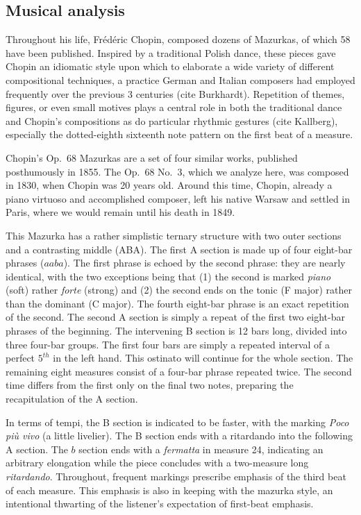 \documentclass[12pt]{article}
\begin{document}
\subsection{Musical analysis}
\label{sec:musical-analysis}

Throughout his life, Fr\'ed\'eric Chopin, composed dozens of Mazurkas,
of which 58 have been published. Inspired by a traditional Polish
dance, these pieces gave Chopin an idiomatic style upon which to
elaborate a wide variety of different compositional techniques, a
practice German and Italian composers had employed frequently over the previous 3
centuries (cite Burkhardt). Repetition of themes, figures, or even small motives plays
a central role in both the traditional dance and Chopin's compositions
as do particular rhythmic gestures (cite Kallberg), especially the
dotted-eighth sixteenth note pattern on the first beat of a measure. 

Chopin's Op.\ 68 Mazurkas are a set of four similar works, published
posthumously in 1855. The Op.\ 68 No.\ 3, which we analyze here, was
composed in 1830, when Chopin was 20 years old. Around this time,
Chopin, already a piano virtuoso and accomplished composer, left his
native Warsaw and settled in Paris, where we would remain until his
death in 1849.

This Mazurka has a rather simplistic ternary structure with two outer
sections and a contrasting middle (ABA). The first A section is made
up of four eight-bar phrases ($aaba$). The first phrase is echoed by the
second phrase: they are nearly identical, with the two exceptions
being that (1) the
second is marked {\em piano} (soft) rather {\em forte} (strong) and (2)
the second ends on the tonic (F major) rather than the dominant
(C major). The fourth eight-bar phrase is an exact repetition of the
second. The second A section is simply a repeat of the first two
eight-bar phrases of the beginning. The intervening B section is 12
bars long, divided into three four-bar groups. The first four bars are
simply a repeated interval of a perfect $5^{th}$ in the left
hand. This ostinato will continue for the whole section. The remaining
eight measures consist of a four-bar phrase repeated twice. The second
time differs from the first only on the final two notes, preparing the
recapitulation of the A section.

In terms of tempi, the B section is indicated to be faster, with the
marking {\em Poco pi\`u vivo} (a little livelier). The B section ends
with a ritardando into the following A section. The $b$ section ends
with a {\em fermatta} in measure 24, indicating an arbitrary
elongation while the piece
concludes with a two-measure long {\em ritardando}. Throughout, 
frequent markings prescribe emphasis of the third beat of each measure. This
emphasis is also in keeping with the mazurka style, an intentional
thwarting of the listener's expectation of first-beat emphasis.
\end{document}
